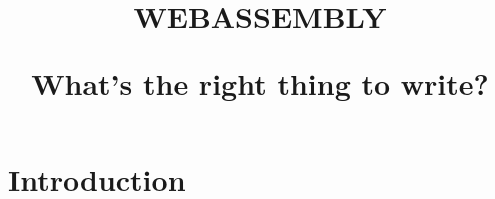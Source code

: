 \documentclass[dvipdfmx,slide,14pt]{beamer}
\title{WEBASSEMBLY

What's the right thing to write?}
\begin{document}
 
\begin{frame}
    \titlepage
\end{frame}

\section{Introduction}


\begin{frame}
    \tableofcontents
\end{frame}






\end{document}
